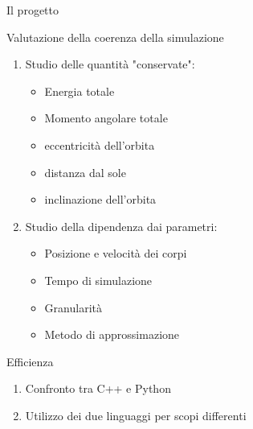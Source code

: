     \begin{frame}{Il progetto}
        \begin{block}{Valutazione della coerenza della simulazione}
            \begin{enumerate}
                \item Studio delle quantità "conservate":
                \begin{itemize}
                    \item Energia totale
                    \item Momento angolare totale
                    \item eccentricità dell'orbita
                    \item distanza dal sole
                    \item inclinazione dell'orbita
                \end{itemize}
                \item Studio della dipendenza dai parametri:
                \begin{itemize}
                    \item Posizione e velocità dei corpi
                    \item Tempo di simulazione
                    \item Granularità
                    \item Metodo di approssimazione
                \end{itemize}              
            \end{enumerate}
        \end{block}

        \begin{block}{Efficienza}
            \begin{enumerate}
                \item Confronto tra C++ e Python
                \item Utilizzo dei due linguaggi per scopi differenti
            \end{enumerate}
        \end{block}
        
    \end{frame}
